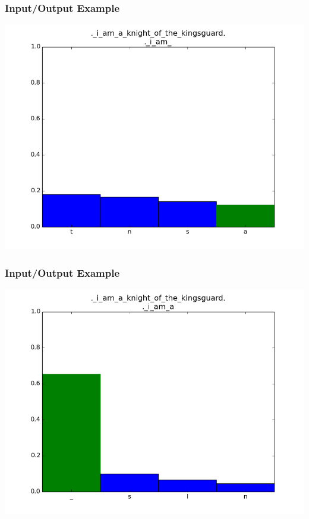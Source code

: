 \documentclass[12]{beamer}
\begin{document}
\begin{frame}
\frametitle{Input/Output Example}
\begin{center}
\includegraphics[scale=0.4]{../distplot/06.png}
\end{center}
\end{frame}

\begin{frame}
\frametitle{Input/Output Example}
\begin{center}
\includegraphics[scale=0.4]{../distplot/07.png}
\end{center}
\end{frame}
\end{document}
